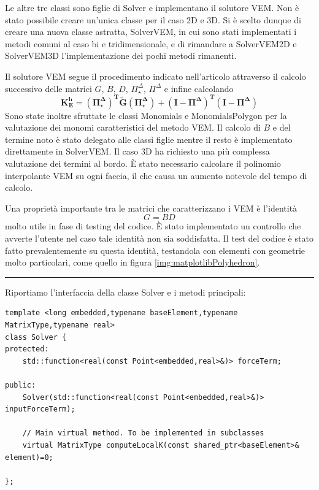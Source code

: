 \documentclass[oneside,12pt]{book}  %
\theoremstyle{plain}
\theoremstyle{definition}
\theoremstyle{remark}
\numberwithin{equation}{chapter} %
\begin{document}
Le altre tre classi sono figlie di Solver e implementano il solutore
VEM. Non \`e stato possibile creare un'unica classe per il caso 2D e
3D. Si \`e scelto dunque di creare una nuova classe astratta,
SolverVEM, in cui sono stati implementati i metodi comuni al caso bi
e tridimensionale, e di rimandare a SolverVEM2D e SolverVEM3D
l'implementazione dei pochi metodi rimanenti. 

Il solutore VEM segue il procedimento indicato nell'articolo
\cite{beirao2014hitchhiker} attraverso il calcolo successivo delle
matrici $G$, $B$, $D$, $\Pi^\Delta_\star$, $\Pi^\Delta$ e infine
calcolando $$ \mathbf{K_E^h= (\Pi^\Delta_\star)^T \tilde{G}
  (\Pi^\Delta_\star)+(I-\Pi^\Delta)^T (I-\Pi^\Delta)} $$ 
Sono state inoltre sfruttate le classi Monomials e MonomialsPolygon
per la valutazione dei monomi caratteristici del metodo VEM. 
Il calcolo di $B$ e del termine noto \`e stato delegato alle classi
figlie mentre il resto \`e implementato direttamente in SolverVEM. Il
caso 3D ha richiesto una pi\`u complessa valutazione dei termini al
bordo. \`E stato necessario calcolare il polinomio interpolante VEM su
ogni faccia, il che causa un aumento notevole del tempo di calcolo.

Una propriet\`a importante tra le matrici che caratterizzano i VEM \`e
l'identit\`a $$G=BD$$ molto utile in fase di testing del codice. \`E
stato implementato un controllo che avverte l'utente nel caso tale
identit\`a non sia soddisfatta. Il test del codice \`e stato fatto
prevalentemente su questa identit\`a, testandola con elementi con
geometrie molto particolari, come quello in figura
\ref{img:matplotlibPolyhedron}.


\noindent\rule{14cm}{1pt}

Riportiamo l'interfaccia della classe Solver e i metodi principali:

\begin{verbatim}
template <long embedded,typename baseElement,typename MatrixType,typename real>
class Solver {
protected:
    std::function<real(const Point<embedded,real>&)> forceTerm;
	
public:
    Solver(std::function<real(const Point<embedded,real>&)> inputForceTerm);

    // Main virtual method. To be implemented in subclasses
    virtual MatrixType computeLocalK(const shared_ptr<baseElement>& element)=0;
	
};

\end{verbatim}
\end{document}
